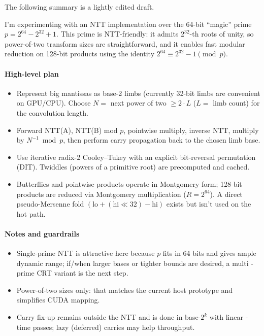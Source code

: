 The following summary is a lightly edited draft.

I'm experimenting with an NTT implementation over the 64-bit ``magic'' prime $p 
= 2^{64} - 2^{32} + 1$. This prime is NTT-friendly: it admits $2^{32}$-th roots 
of unity, so power-of-two transform sizes are straightforward, and it enables 
fast modular reduction on 128-bit products using the identity $2^{64} \equiv 2^{
32} - 1 \pmod p$.

\paragraph{High-level plan}

\begin{itemize}

\item Represent big mantissas as base-2 limbs (currently 32-bit limbs are 
convenient on GPU/CPU). Choose $N =$ next power of two $\ge 2\cdot L$ ($L =$ 
limb count) for the convolution length.

\item Forward NTT(A), NTT(B) mod $p$, pointwise multiply, inverse NTT, multiply 
by $N^{-1} \bmod p$, then perform carry propagation back to the chosen limb 
base.

\item Use iterative radix-2 Cooley--Tukey with an explicit bit-reversal 
permutation (DIT). Twiddles (powers of a primitive root) are precomputed and 
cached.

\item Butterflies and pointwise products operate in Montgomery form; 128-bit 
products are reduced via Montgomery multiplication ($R = 2^{64}$). A direct 
pseudo-Mersenne fold $(\text{lo} + (\text{hi} \ll 32) - \text{hi})$ exists but 
isn’t used on the hot path.

\end{itemize}

\paragraph{Notes and guardrails}

\begin{itemize}

\item Single-prime NTT is attractive here because $p$ fits in 64 bits and gives 
ample dynamic range; if/when larger bases or tighter bounds are desired, a multi
-prime CRT variant is the next step.

\item Power-of-two sizes only: that matches the current host prototype and 
simplifies CUDA mapping.

\item Carry fix-up remains outside the NTT and is done in base-$2^k$ with linear
-time passes; lazy (deferred) carries may help throughput.

\end{itemize}

